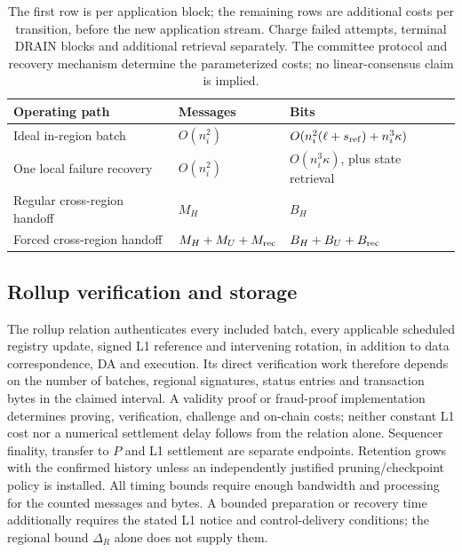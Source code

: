 \documentclass[11pt,a4paper,onecolumn]{article}
\newcounter{protocol}
\begin{document}
\begin{table}[htbp]\centering\small
\begin{tabularx}{\linewidth}{@{}p{.30\linewidth}p{.24\linewidth}Y@{}}
\toprule
Operating path & Messages & Bits\\\midrule
Ideal in-region batch & $O(n_i^2)$ & $O(n_i^2(\ell+s_{\rm ref})+n_i^3\kappa)$\\
One local failure recovery & $O(n_i^2)$ & $O(n_i^3\kappa)$, plus state retrieval\\
Regular cross-region handoff & $M_H$ & $B_H$\\
Forced cross-region handoff & $M_H+M_U+M_{\rm rec}$ & $B_H+B_U+B_{\rm rec}$\\
\bottomrule
\end{tabularx}
\caption{The first row is per application block; the remaining rows are
additional costs per transition, before the new application stream. Charge
failed attempts, terminal DRAIN blocks and additional retrieval separately.
The committee protocol and recovery mechanism determine the parameterized
costs; no linear-consensus claim is implied.}
\label{tab:communication-paths}
\end{table}

\subsection{Rollup verification and storage}
The rollup relation authenticates every included batch, every applicable
scheduled registry update, signed L1 reference and intervening rotation, in addition to data
correspondence, DA and execution. Its direct verification work therefore
depends on the number of batches, regional signatures, status entries and
transaction bytes in the claimed interval. A validity proof or fraud-proof
implementation determines proving, verification, challenge and on-chain
costs; neither constant L1 cost nor a numerical settlement delay follows
from the relation alone. Sequencer finality, transfer to $P$ and L1
settlement are separate endpoints. Retention grows with the confirmed
history unless an independently justified pruning/checkpoint policy is
installed. All timing bounds require enough bandwidth and processing for
the counted messages and bytes. A bounded preparation or recovery time
additionally requires the stated L1 notice and control-delivery conditions;
the regional bound $\Delta_R$ alone does not supply them.
\end{document}
